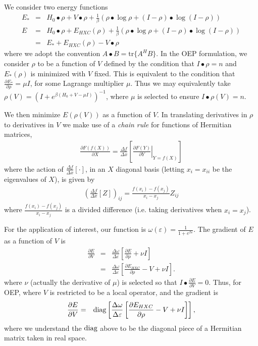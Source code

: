 \documentclass{article}
\newcommand{\beas}{\begin{eqnarray*}}
\newcommand{\enas}{\end{eqnarray*}}
\newcommand{\trace}{\mbox{tr}} \newcommand{\real}{\mathcal Re}
\newcommand{\Vscp}{V}
\begin{document}
We consider two energy functions
\beas
E_{*} &=& H_0 \bullet \rho + \Vscp \bullet \rho + \frac{1}{\beta}
           \left( \rho \bullet \log \rho + (I-\rho) \bullet\log (I-\rho) \right)\\
E &=& H_0 \bullet \rho + E_{HXC}(\rho) + \frac{1}{\beta}
           \left(\rho\bullet \log\rho +(I-\rho) \bullet\log (I-\rho) \right)\\
  &=& E_{*} + E_{HXC}(\rho) - \Vscp \bullet \rho
\enas
where we adopt the convention $A \bullet B = \trace\{A^H B\}$.
In the OEP formulation,
we consider $\rho$ to be a function of $\Vscp$ defined by the condition
that $I \bullet \rho = n$ and $E_{*}(\rho)$ is minimized with $\Vscp$ fixed.
This is equivalent to the condition that
$\frac{\partial E_{*}}{\partial \rho} = \mu I$, for some
Lagrange multiplier $\mu$.
Thus we may equivalently take
$\rho(\Vscp) = (I + e^{\beta (H_0 + \Vscp - \mu I)})^{-1}$,
where $\mu$ is selected to ensure $I\bullet \rho(\Vscp) = n$.

We then minimize $E(\rho(\Vscp))$ as a function of $\Vscp$.
In translating derivatives in $\rho$ to derivatives in $\Vscp$ we make use of
a {\em chain rule} for functions of Hermitian matrices,
\beas
  \frac{\partial F( f(X) )}{\partial X}
  = \frac{\Delta f}{\Delta x}\left[ 
    \left. \frac{\partial F(Y)}{\partial Y}\right|_{Y = f(X)} \right]
\enas
where the action of $\frac{\Delta f}{\Delta x}\left[\cdot\right]$, in an
$X$ diagonal basis (letting $x_i = x_{ii}$ be the eigenvalues of $X$), is given by
\beas
\left(\frac{\Delta f}{\Delta x}\left[ Z \right]\right)_{ij}
  = \frac{f(x_{i}) - f(x_{j})}{x_{i}-x_{j}} Z_{ij}
\enas
where $ \frac{f(x_{i}) - f(x_{j})}{x_{i}-x_{j}}$ is
a divided difference (i.e. taking derivatives when $x_{i} = x_{j}$).

For the application of interest, our function is
$\omega(\varepsilon) = \frac{1}{1+e^{\beta \varepsilon}}$.
The gradient of $E$ as a function of $\Vscp$ is
\beas
  \frac{\partial E}{\partial \Vscp}
  &=& \frac{\Delta \omega}{\Delta \varepsilon}
      \left[ \frac{\partial E}{\partial \rho} + \nu I \right]\\
  &=& \frac{\Delta \omega}{\Delta \varepsilon}
      \left[ \frac{\partial E_{HXC}}{\partial \rho} - \Vscp + \nu I \right].
\enas
where $\nu$ (actually the derivative of $\mu$) is selected so that 
$I\bullet \frac{\partial E}{\partial \Vscp} = 0$.
Thus, for OEP, where $\Vscp$ is restricted to be a local operator,
and the gradient is
\beas
  \frac{\partial E}{\partial \Vscp}
  &=& \diag\left[\frac{\Delta \omega}{\Delta \varepsilon}
      \left[ \frac{\partial E_{HXC}}{\partial \rho} - \Vscp + \nu I \right]\right],
\enas
where we understand the $\mbox{diag}$ above to be the diagonal piece of a Hermitian
matrix taken in real space.
\end{document}
